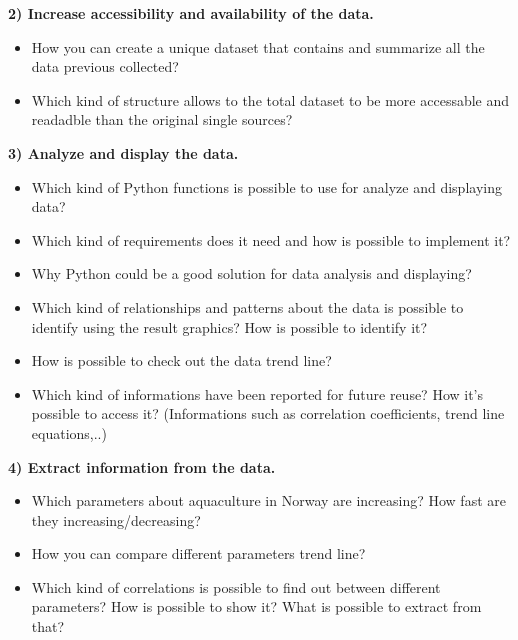  
\textbf{2) Increase accessibility and availability of the data.}
\vspace{-5mm}
\begin{itemize}
 \setlength{\itemsep}{-5pt}
  \item How you can create a unique dataset that contains and summarize all the data previous collected?
  \item Which kind of structure allows to the total dataset to be more accessable and readadble than the original single sources?
\end{itemize}
 
\textbf{3) Analyze and display the data.}
\vspace{-5mm}
\begin{itemize}
 \setlength{\itemsep}{-5pt}
  \item Which kind of Python functions is possible to use for analyze and displaying data? 
  \item Which kind of requirements does it need and how is possible to implement it?
  \item Why Python could be a good solution for data analysis and displaying? 
  \item Which kind of relationships and patterns about the data is possible to identify using the result graphics? How is possible to identify it?
  \item How is possible to check out the data trend line? 
  \item Which kind of informations have been reported for future reuse? How it's possible to access it? (Informations such as correlation coefficients, trend line equations,..)
 \end{itemize}


\textbf{4) Extract information from the data.}
\vspace{-5mm}
\begin{itemize}
 \setlength{\itemsep}{-5pt}
  \item Which parameters about aquaculture in Norway are increasing? How fast are they increasing/decreasing? 
  \item How you can compare different parameters trend line?
  \item Which kind of correlations is possible to find out between different parameters? How is possible to show it? What is possible to extract from that?
 \end{itemize}
 
 \newpage
 
